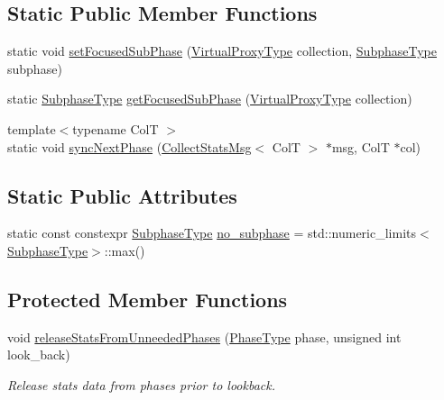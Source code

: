 \subsection*{Static Public Member Functions}
\begin{DoxyCompactItemize}
\item 
static void \hyperlink{structvt_1_1vrt_1_1collection_1_1balance_1_1_element_stats_a783aba29f79b50652c78ca148b766578}{set\+Focused\+Sub\+Phase} (\hyperlink{namespacevt_a1b417dd5d684f045bb58a0ede70045ac}{Virtual\+Proxy\+Type} collection, \hyperlink{namespacevt_ae78cbfdf1e57470e33eedb074f2beeba}{Subphase\+Type} subphase)
\item 
static \hyperlink{namespacevt_ae78cbfdf1e57470e33eedb074f2beeba}{Subphase\+Type} \hyperlink{structvt_1_1vrt_1_1collection_1_1balance_1_1_element_stats_ac52b9e7f8ba66cc20e8130fa1e037e07}{get\+Focused\+Sub\+Phase} (\hyperlink{namespacevt_a1b417dd5d684f045bb58a0ede70045ac}{Virtual\+Proxy\+Type} collection)
\item 
{\footnotesize template$<$typename ColT $>$ }\\static void \hyperlink{structvt_1_1vrt_1_1collection_1_1balance_1_1_element_stats_ae9425ce57397a368d58db9883b996939}{sync\+Next\+Phase} (\hyperlink{structvt_1_1vrt_1_1collection_1_1balance_1_1_collect_stats_msg}{Collect\+Stats\+Msg}$<$ ColT $>$ $\ast$msg, ColT $\ast$col)
\end{DoxyCompactItemize}
\subsection*{Static Public Attributes}
\begin{DoxyCompactItemize}
\item 
static const constexpr \hyperlink{namespacevt_ae78cbfdf1e57470e33eedb074f2beeba}{Subphase\+Type} \hyperlink{structvt_1_1vrt_1_1collection_1_1balance_1_1_element_stats_a26682687c88b2c607365b040a9804096}{no\+\_\+subphase} = std\+::numeric\+\_\+limits$<$\hyperlink{namespacevt_ae78cbfdf1e57470e33eedb074f2beeba}{Subphase\+Type}$>$\+::max()
\end{DoxyCompactItemize}
\subsection*{Protected Member Functions}
\begin{DoxyCompactItemize}
\item 
void \hyperlink{structvt_1_1vrt_1_1collection_1_1balance_1_1_element_stats_ad4b2837712ee0eb53fe5839a0b71e4bc}{release\+Stats\+From\+Unneeded\+Phases} (\hyperlink{namespacevt_a46ce6733d5cdbd735d561b7b4029f6d7}{Phase\+Type} phase, unsigned int look\+\_\+back)
\begin{DoxyCompactList}\small\item\em Release stats data from phases prior to lookback. \end{DoxyCompactList}\end{DoxyCompactItemize}
